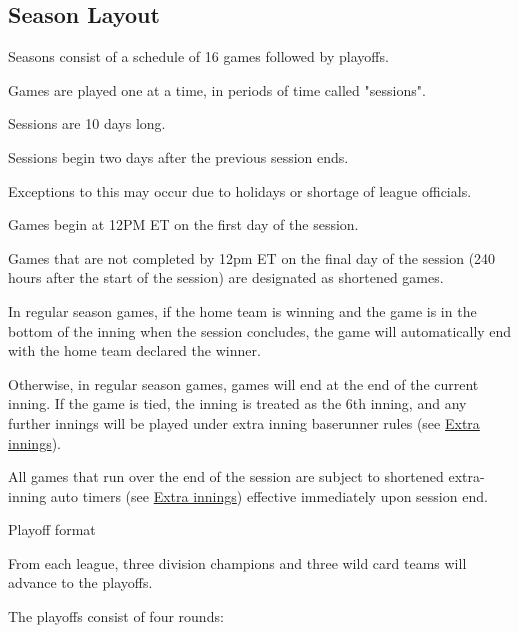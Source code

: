 
\subsection{Season Layout}
\begin{deepEnumerate}
	\item Seasons consist of a schedule of 16 games followed by playoffs.
	\item Games are played one at a time, in periods of time called "sessions".
	\begin{deepEnumerate}
		\item Sessions are 10 days long.
		\item Sessions begin two days after the previous session ends.
		\begin{deepEnumerate}
			\item Exceptions to this may occur due to holidays or shortage of league officials.
		\end{deepEnumerate}
		\item Games begin at 12PM ET on the first day of the session.
		\item Games that are not completed by 12pm ET on the final day of the session
		(240 hours after the start of the session) are designated as shortened games.
		\begin{deepEnumerate}
			\item In regular season games, if the home team is winning and the game is in the bottom of the inning
			when the session concludes,	the game will automatically end with the home team declared the winner.
			\item Otherwise, in regular season games, games will end at the end of the current inning.
			If the game is tied, the inning is treated as the 6th inning, and any further innings will be played under extra inning baserunner rules
			(see \hyperref[sec:extra innings]{Extra innings}).
			\item All games that run over the end of the session are subject to shortened extra-inning auto timers
			(see \hyperref[sec:extra innings]{Extra innings}) effective immediately upon session end.
		\end{deepEnumerate}
		\item Playoff format
		\begin{deepEnumerate}
			\item From each league, three division champions and three wild card teams will advance to the playoffs.
			\item The playoffs consist of four rounds:

\end{deepEnumerate}
\end{deepEnumerate}
\end{deepEnumerate}
